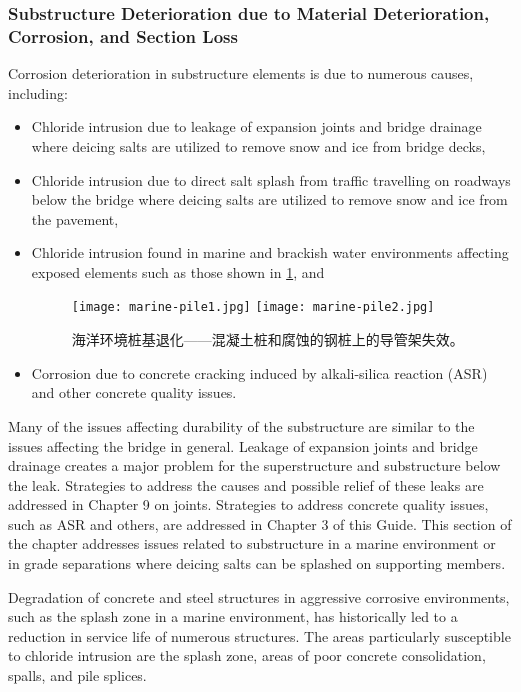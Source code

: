 \subsubsection{Substructure Deterioration due to Material Deterioration, Corrosion, and Section Loss}
Corrosion deterioration in substructure elements is due to numerous causes, including:
\begin{itemize}
  \item Chloride intrusion due to leakage of expansion joints and bridge drainage where deicing salts are utilized to remove snow and ice from bridge decks,
  \item Chloride intrusion due to direct salt splash from traffic travelling on roadways below the bridge where deicing salts are utilized to remove snow and ice from the pavement,
  \item Chloride intrusion found in marine and brackish water environments affecting exposed elements such as  those shown in \cref{fig:marine-pile-degradation}, and
  \begin{figure}
    \texttt{[image: marine-pile1.jpg]}\hfill
    \texttt{[image: marine-pile2.jpg]}
    \caption{海洋环境桩基退化——混凝土桩和腐蚀的钢桩上的导管架失效。}
    \label{fig:marine-pile-degradation}
  \end{figure}
  \item  Corrosion due to concrete cracking induced by alkali-silica reaction (ASR) and other concrete quality issues.
\end{itemize}

Many of the issues affecting durability of the substructure are similar to the issues affecting the bridge in general.
Leakage of expansion joints and bridge drainage creates a major problem for the superstructure and substructure
below the leak. Strategies to address the causes and possible relief of these leaks are addressed in Chapter 9 on joints.
Strategies to address concrete quality issues, such as ASR and others, are addressed in Chapter 3 of this Guide. This
section of the chapter addresses issues related to substructure in a marine environment or in grade separations where
deicing salts can be splashed on supporting members.

Degradation of concrete and steel structures in aggressive corrosive environments, such as the splash zone in a
marine environment, has historically led to a reduction in service life of numerous structures. The areas particularly
susceptible to chloride intrusion are the splash zone, areas of poor concrete consolidation, spalls, and pile splices.

